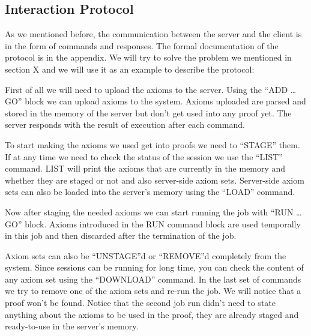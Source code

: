 \subsection{Interaction Protocol}\label{subsec:interactionProtocol}
As we mentioned before, the communication between the server and the client is in the form of commands and responses. The formal documentation of the protocol is in the appendix. We will try to solve the problem we mentioned in section X and we will use it as an example to describe the protocol:

First of all we will need to upload the axioms to the server. Using the ``ADD \ldots GO'' block we can upload axioms to the system. Axioms uploaded are parsed and stored in the memory of the server but don't get used into any proof yet. The server responds with the result of execution after each command.

To start making the axioms we used get into proofs we need to ``STAGE'' them. If at any time we need to check the status of the session we use the ``LIST'' command. LIST will print the axioms that are currently in the memory and whether they are staged or not and also server-side axiom sets. Server-side axiom sets can also be loaded into the server's memory using the ``LOAD'' command.

Now after staging the needed axioms we can start running the job with ``RUN \ldots GO'' block. Axioms introduced in the RUN command block are used temporally in this job and then discarded after the termination of the job.

Axiom sets can also be ``UNSTAGE''d or ``REMOVE''d completely from the system. Since sessions can be running for long time, you can check the content of any axiom set using the ``DOWNLOAD'' command. In the last set of commands we try to remove one of the axiom sets and re-run the job. We will notice that a proof won't be found. Notice that the second job run didn't need to state anything about the axioms to be used in the proof, they are already staged and ready-to-use in the server's memory.
